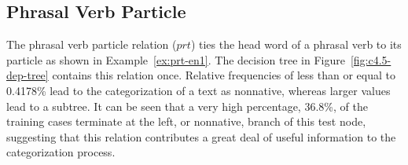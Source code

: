 \documentclass[main.tex]{subfiles}
\begin{document}

\subsection{Phrasal Verb Particle}

The phrasal verb particle relation ($prt$) ties the head word of a phrasal verb to its particle as shown in Example~\ref{ex:prt-en1}. The decision tree in Figure~\ref{fig:c4.5-dep-tree} contains this relation once. Relative frequencies of less than or equal to 0.4178\% lead to the categorization of a text as nonnative, whereas larger values lead to a subtree. It can be seen that a very high percentage, 36.8\%, of the training cases terminate at the left, or nonnative, branch of this test node, suggesting that this relation contributes a great deal of useful information to the categorization process.
\end{document}

